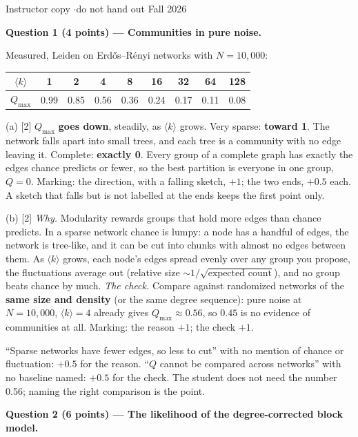 \documentclass[a4paper, 11pt]{extarticle}
\renewcommand{\question}[3]{\vspace{0.3em}
  {\large\bfseries Question #1 \quad\normalsize\mdseries (#2 points) --- #3}\par
  \vspace{-0.3em}{\color{rulegrey}\rule{\textwidth}{0.6pt}}\par\vspace{0.1em}}
\newcommand{\ans}[1]{{\color{pltblue}\bfseries #1}}
\begin{document}
        {Instructor copy \quad$\cdot$\quad do not hand out}
        {Fall 2026}

\question{1}{4}{Communities in pure noise.}

Measured, Leiden on Erd\H{o}s--R\'enyi networks with $N = 10{,}000$:

\begin{center}
{\renewcommand{\arraystretch}{1.1}
\begin{tabular}{|c||*{8}{c|}}
\hline
$\langle k \rangle$ & 1 & 2 & 4 & 8 & 16 & 32 & 64 & 128 \\ \hline
$Q_{\max}$ & 0.99 & 0.85 & 0.56 & 0.36 & 0.24 & 0.17 & 0.11 & 0.08 \\ \hline
\end{tabular}}
\end{center}

(a) [2] $Q_{\max}$ \ans{goes down}, steadily, as $\langle k \rangle$ grows.
Very sparse: \ans{toward 1}. The network falls apart into small trees, and
each tree is a community with no edge leaving it. Complete:
\ans{exactly 0}. Every group of a complete graph has exactly the edges chance
predicts or fewer, so the best partition is everyone in one group, $Q = 0$.
Marking: the direction, with a falling sketch, $+1$; the two ends, $+0.5$ each.
A sketch that falls but is not labelled at the ends keeps the first point only.

(b) [2] \emph{Why.} Modularity rewards groups that hold more edges than chance
predicts. In a sparse network chance is lumpy: a node has a handful of edges,
the network is tree-like, and it can be cut into chunks with almost no edges
between them. As $\langle k \rangle$ grows, each node's edges spread evenly
over any group you propose, the fluctuations average out (relative size
$\sim 1/\sqrt{\text{expected count}}$), and no group beats chance by much.
\emph{The check.} Compare against randomized networks of the \ans{same size and
density} (or the same degree sequence): pure noise at $N = 10{,}000$,
$\langle k \rangle = 4$ already gives $Q_{\max} \approx 0.56$, so $0.45$ is no
evidence of communities at all. Marking: the reason $+1$; the check $+1$.

``Sparse networks have fewer edges, so less to cut'' with no mention of chance
or fluctuation: $+0.5$ for the reason. ``$Q$ cannot be compared across
networks'' with no baseline named: $+0.5$ for the check. The student does not
need the number 0.56; naming the right comparison is the point.

\question{2}{6}{The likelihood of the degree-corrected block model.}
\end{document}

